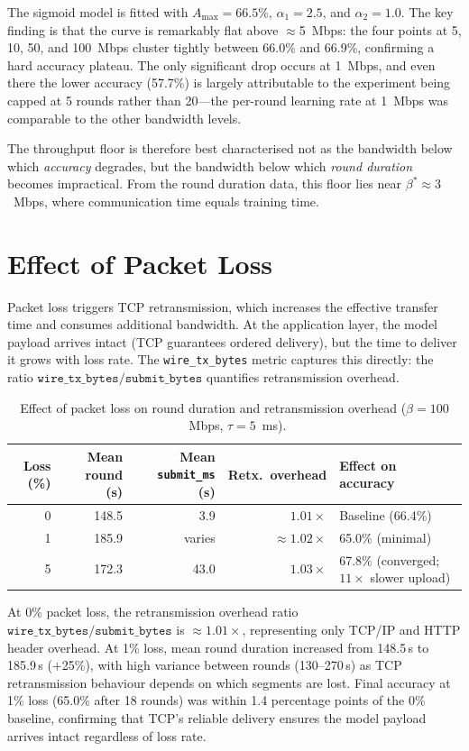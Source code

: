 \documentclass[12pt,a4paper]{report}
\begin{document}
The sigmoid model is fitted with $A_{\max} = 66.5\%$, $\alpha_1 = 2.5$,
and $\alpha_2 = 1.0$.  The key finding is that the curve is remarkably
flat above $\approx$5~Mbps: the four points at 5, 10, 50, and 100~Mbps
cluster tightly between 66.0\% and 66.9\%, confirming a hard accuracy
plateau.  The only significant drop occurs at 1~Mbps, and even there the
lower accuracy (57.7\%) is largely attributable to the experiment being
capped at 5 rounds rather than 20---the per-round learning rate at 1~Mbps
was comparable to the other bandwidth levels.

The throughput floor is therefore best characterised not as the bandwidth
below which \emph{accuracy} degrades, but the bandwidth below which
\emph{round duration} becomes impractical.  From the round duration data,
this floor lies near $\beta^* \approx 3$~Mbps, where communication time
equals training time.

\section{Effect of Packet Loss}
\label{sec:loss_results}

Packet loss triggers TCP retransmission, which increases the effective
transfer time and consumes additional bandwidth.  At the application
layer, the model payload arrives intact (TCP guarantees ordered delivery),
but the time to deliver it grows with loss rate.  The
\texttt{wire\_tx\_bytes} metric captures this directly: the ratio
$\texttt{wire\_tx\_bytes} / \texttt{submit\_bytes}$ quantifies
retransmission overhead.

\begin{table}[H]
\centering
\caption{Effect of packet loss on round duration and retransmission
  overhead ($\beta = 100$~Mbps, $\tau = 5$~ms).}
\label{tab:loss}
\begin{tabular}{rrrrl}
\toprule
Loss (\%) & Mean round (s) & Mean \texttt{submit\_ms} (s) &
  Retx.\ overhead & Effect on accuracy \\
\midrule
0 & 148.5 & 3.9 & $1.01\times$ & Baseline (66.4\%) \\
1 & 185.9 & varies & $\approx 1.02\times$ & 65.0\% (minimal) \\
5 & 172.3 & 43.0 & $1.03\times$ & 67.8\% (converged; $11\times$ slower upload) \\
\bottomrule
\end{tabular}
\end{table}

At 0\% packet loss, the retransmission overhead ratio
$\texttt{wire\_tx\_bytes} / \texttt{submit\_bytes}$ is $\approx 1.01\times$,
representing only TCP/IP and HTTP header overhead.  At 1\% loss, mean round
duration increased from 148.5\,s to 185.9\,s ($+$25\%), with high
variance between rounds (130--270\,s) as TCP retransmission behaviour
depends on which segments are lost.  Final accuracy at 1\% loss (65.0\%
after 18 rounds) was within 1.4 percentage points of the 0\% baseline,
confirming that TCP's reliable delivery ensures the model payload arrives
intact regardless of loss rate.
\end{document}
